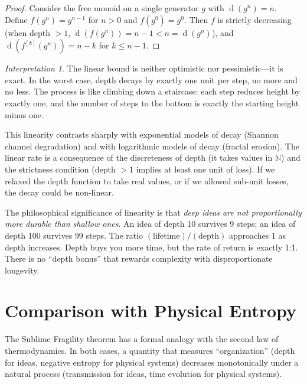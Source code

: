 \documentclass[11pt,openany]{book}
\theoremstyle{definition}
\theoremstyle{plain}
\theoremstyle{remark}
\newtheorem{interpretation}[axiom]{Interpretation}
\newcommand{\depth}{\operatorname{d}}       %
\begin{document}
\begin{proof}
Consider the free monoid on a single generator $g$ with $\depth(g^n) = n$. Define $f(g^n) = g^{n-1}$ for $n > 0$ and $f(g^0) = g^0$. Then $f$ is strictly decreasing (when depth $> 1$, $\depth(f(g^n)) = n - 1 < n = \depth(g^n)$), and $\depth(f^{[k]}(g^n)) = n - k$ for $k \leq n - 1$.
\end{proof}

\begin{interpretation}
The linear bound is neither optimistic nor pessimistic---it is exact. In the worst case, depth decays by exactly one unit per step, no more and no less. The process is like climbing down a staircase: each step reduces height by exactly one, and the number of steps to the bottom is exactly the starting height minus one.

This linearity contrasts sharply with exponential models of decay (Shannon channel degradation) and with logarithmic models of decay (fractal erosion). The linear rate is a consequence of the discreteness of depth (it takes values in $\mathbb{N}$) and the strictness condition (depth $> 1$ implies at least one unit of loss). If we relaxed the depth function to take real values, or if we allowed sub-unit losses, the decay could be non-linear.

The philosophical significance of linearity is that \emph{deep ideas are not proportionally more durable than shallow ones}. An idea of depth 10 survives 9 steps; an idea of depth 100 survives 99 steps. The ratio $(\text{lifetime}) / (\text{depth})$ approaches 1 as depth increases. Depth buys you more time, but the rate of return is exactly 1:1. There is no ``depth bonus'' that rewards complexity with disproportionate longevity.
\end{interpretation}

\section{Comparison with Physical Entropy}

The Sublime Fragility theorem has a formal analogy with the second law of thermodynamics. In both cases, a quantity that measures ``organization'' (depth for ideas, negative entropy for physical systems) decreases monotonically under a natural process (transmission for ideas, time evolution for physical systems).
\end{document}
